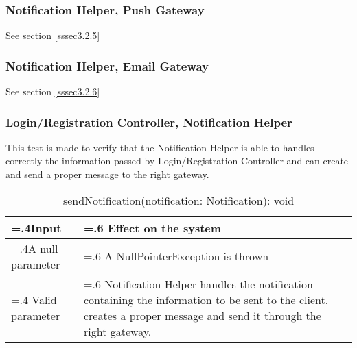 \documentclass[10pt, a4paper,titlepage]{article}
\begin{document}
\subsubsection{Notification Helper, Push Gateway}
See section \ref{sssec3.2.5}
\subsubsection{Notification Helper, Email Gateway}
See section \ref{sssec3.2.6}
\subsubsection{Login/Registration Controller, Notification Helper}
This test is made to verify that the Notification Helper is able to handles correctly the information passed by Login/Registration Controller and can create and send a proper message to the right gateway.
\begin{table}[h]
\caption{sendNotification(notification: Notification): void}
\begin{tabularx}{\textwidth}{|>{\hsize=.4\hsize}X|>{\hsize=.6\hsize}X|}
\hline
Input & Effect on the system\\
\hline
A null parameter & A NullPointerException is thrown\\ 
\hline
Valid parameter & Notification Helper handles the notification containing the information to be sent to the client, creates a proper message and send it through the right gateway.\\
\hline
\end{tabularx}
\end{table}
\linebreak
\end{document}
